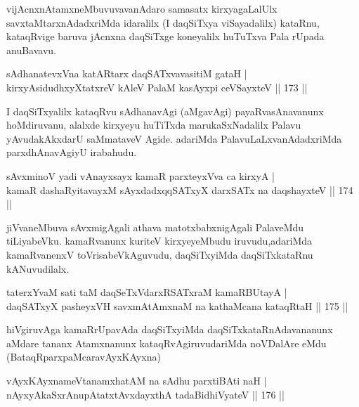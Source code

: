 \begin{artha}
vijAcnxnAtamxneMbuvuvavanAdaro samasatx kirxyagaLalUlx savxtaMtarxnAdadxriMda idaralilx (I daqSiTxya viSayadalilx) kataRnu, kataqRvige baruva jAcnxna daqSiTxge koneyalilx huTuTxva Pala rUpada anuBavavu.
\end{artha}

\begin{shl}
sAdhanatevxVna katAR\s tarx daqSATxvavasitiM gataH |\\
kirxyAsidudhxyXtatxreV kAleV PalaM kasAyxpi ceVSayxteV \hfill || 173 ||
\end{shl}

\begin{artha}
I daqSiTxyalilx kataqRvu sAdhanavAgi (aMgavAgi) payaRvasAnavanunx hoMdiruvanu, alalxde kirxyeyu huTiTxda marukaSxNadalilx Palavu yAvudakAkxdarU  saMmataveV Agide. adariMda PalavuLaLxvanAdadxriMda parxdhAnavAgiyU irabahudu.
\end{artha}


\begin{shl}
sAvxminoV yadi vA\s nayxsayx kamaR parxteyxVva ca kirxyA |\\
kamaR dashaRyitavayxM sAyxdadxqqSATxyX darxSATx na daqshayxteV \hfill || 174 ||
\end{shl}

\begin{artha}
jiVvaneMbuva sAvxmigAgali athava matotxbabxnigAgali PalaveMdu tiLiyabeVku. kamaRvanunx kuriteV kirxyeyeMbudu iruvudu,\break adariMda kamaRvanenxV toVrisabeVkAguvudu, daqSiTxyiMda daqSiTxkataRnu kANuvudilalx.
\end{artha}


\begin{shl}
taterxYvaM sati taM daqSeTxVdarxRSATxraM kamaRBUtayA |\\
daqSATxyX pasheyxVH savxmAtAmxnaM na kathaMcana kataqRtaH \hfill || 175 ||
\end{shl}

\begin{artha}
hiVgiruvAga kamaRrUpavAda daqSiTxyiMda daqSiTxkataRnAdavananunx aMdare tananx Atamxnanunx kataqRvAgiruvudariMda noVDalAre eMdu (BataqRparxpaMcaravAyxKAyxna)
\end{artha}


\begin{shl}
vAyxKAyxnameVtanamxhatAM na sAdhu parxtiBAti naH |\\
nAyxyAkaSxrAnupAtatxtAvxdayxthA tadaBidhiVyateV \hfill || 176 ||
\end{shl}

